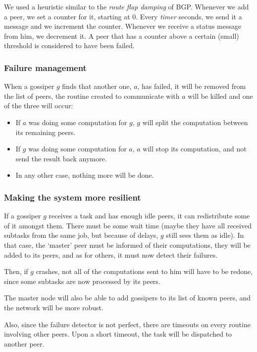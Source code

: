 \documentclass[a4paper,12pt]{article}
\begin{document}
    We used a heuristic similar to the \textit{route flap damping} of BGP. Whenever we add a peer, we set a counter for it, starting at 0. Every \textit{timer} seconds, we send it a message and we increment the counter. Whenever we receive a status message from him, we decrement it. A peer that has a counter above a certain (small) threshold is considered to have been failed.
    
    \subsubsection{Failure management}
    When a gossiper $g$ finds that another one, $a$, has failed, it will be removed from the list of peers, the routine created to communicate with $a$ will be killed and one of the three will occur:

\begin{itemize}
\item If $a$ was doing some computation for $g$, $g$ will split the computation between its remaining peers.
\item If $g$ was doing some computation for $a$, $a$ will stop its computation, and not send the result back anymore.
\item In any other case, nothing more will be done.
\end{itemize}

    \subsubsection{Making the system more resilient}
    If a gossiper $g$ receives a task and has enough idle peers, it can redistribute some of it amongst them. There must be some wait time (maybe they have all received subtasks from the same job, but because of delays, $g$ still sees them as idle).
In that case, the ‘master’ peer must be informed of their computations, they will be added to its peers, and as for others, it must now detect their failures.

    Then, if $g$ crashes, not all of the computations sent to him will have to be redone, since some subtasks are now processed by its peers.

    The master node will also be able to add gossipers to its list of known peers, and the network will be more robust.
    
    Also, since the failure detector is not perfect, there are timeouts on every routine involving other peers. Upon a short timeout, the task will be dispatched to another peer.
\end{document}
